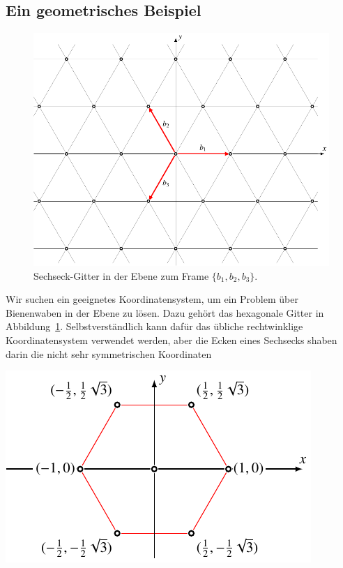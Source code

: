 \subsection{Ein geometrisches Beispiel
\label{subsection:hexagon}}
\begin{figure}
\centering
\includegraphics{chapters/1-geometrie/images/hexagon.pdf}
\caption{Sechseck-Gitter in der Ebene zum Frame $\{b_1,b_2,b_3\}$.
\label{geometrie:hexagon:image}}
\end{figure}
Wir suchen ein geeignetes Koordinatensystem, um ein Problem über
Bienenwaben in der Ebene zu lösen.
Dazu gehört das hexagonale Gitter in Abbildung~\ref{geometrie:hexagon:image}.
Selbstverständlich kann dafür das übliche rechtwinklige Koordinatensystem
verwendet werden, aber die Ecken eines Sechsecks shaben darin die nicht
sehr symmetrischen Koordinaten
\begin{center}
\includegraphics{chapters/1-geometrie/images/hexagon1.pdf}
\end{center}
